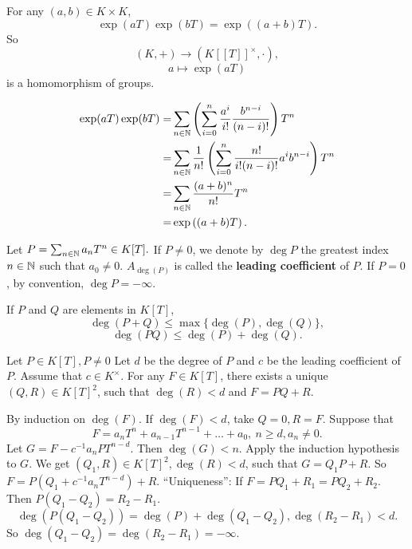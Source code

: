 \begin{propositionenv}
    For any $(a,b)\in K\times K$, 
    $$\exp(aT)\exp(bT)=\exp\left((a+b)T\right).$$ 
    So 
    $$(K,+)\longrightarrow (K[\![T]\!]^\times, \cdot),$$
    $$a\longmapsto \exp(aT)$$
    is a homomorphism of groups.
\end{propositionenv}
\begin{proofenv}
    \begin{align*}
        \exp(aT)\exp(bT)=&\sum_{n\in\mathbb{N}}\left(\sum_{i=0}^{n}\frac{a^i}{i!}\frac{b^{n-i}}{(n-i)!}\right)T^n\\
        =&\sum_{n\in\mathbb{N}}\frac{1}{n!}\left(\sum_{i=0}^{n}\frac{n!}{i!(n-i)!}a^ib^{n-i}\right)T^n\\
        =&\sum_{n\in\mathbb{N}}\frac{(a+b)^n}{n!}T^n\\
        =&\exp\left((a+b)T\right).
    \end{align*}
\end{proofenv}
\begin{definitionenv}
    Let $P=\sum_{n\in\mathbb{N}}a_nT^n\in K[T].$ If $P\not=0$, we denote by $\deg P$ the greatest index $n\in \mathbb{N}$ such that $a_0\not=0$. $A_{\deg(P)}$ is called the \textbf{leading coefficient} of $P$. If $P=0$, by convention, $\deg P=-\infty$.
\end{definitionenv}
\begin{propositionenv}
    If $P$ and $Q$ are elements in $K[T]$, 
    $$\deg(P+Q)\le \max\{\deg(P),\deg(Q)\},$$
    $$\deg(PQ)\le\deg(P)+\deg(Q).$$
\end{propositionenv}
\begin{theoremenv}
    Let $P\in K[T], P\not=0$ Let $d$ be the degree of $P$ and $c$ be the leading coefficient of $P$. Assume that $c\in K^\times$. For any $F\in K[T]$, there exists a unique $(Q,R)\in K[T]^2$, such that $\deg(R)<d$ and $F=PQ+R$. 
\end{theoremenv}
\begin{proofenv}
    By induction on $\deg (F)$. If $\deg(F)<d$, take $Q=0,R=F$. Suppose that
    $$F=a_nT^n+a_{n-1}T^{n-1}+\dots+a_0, \ n\ge d, a_n\not=0.$$
    Let $G=F-c^{-1}a_nPT^{n-d}$. Then $\deg(G)<n$. Apply the induction hypothesis to $G$. We get $(Q_1,R)\in K[T]^2, \deg(R)<d$, such that $G=Q_1P+R$. So $F=P(Q_1+c^{-1}a_nT^{n-d})+R$.
    \newline
    ``Uniqueness'': If $F=PQ_1+R_1=PQ_2+R_2$. Then $P(Q_1-Q_2)=R_2-R_1$. 
    $$\deg(P(Q_1-Q_2))=\deg(P)+\deg(Q_1-Q_2), \deg(R_2-R_1)<d.$$
    So $\deg(Q_1-Q_2)=\deg(R_2-R_1)=-\infty.$
\end{proofenv}
